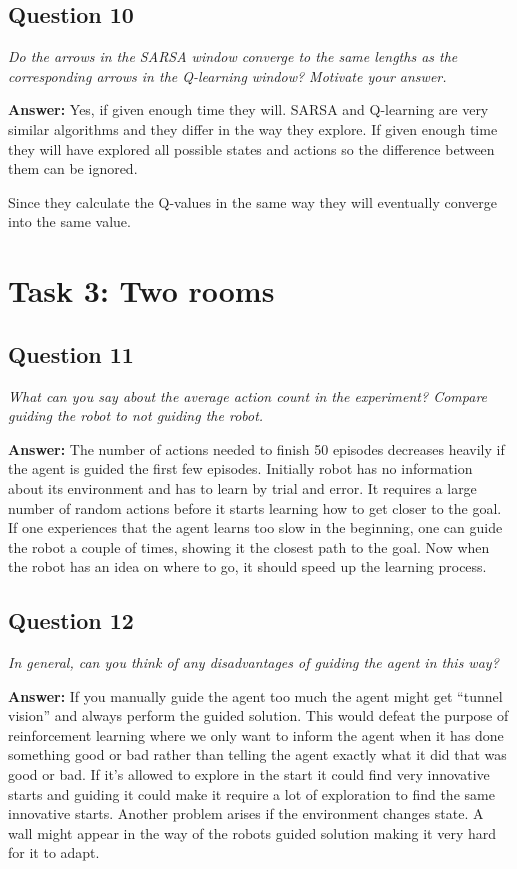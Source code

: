 \documentclass[a4paper]{article}
\begin{document}
\subsection*{Question 10}
\emph{Do the arrows in the SARSA window converge to the same
lengths as the corresponding arrows in the Q-learning window? Motivate your answer.}

\textbf{Answer:} Yes, if given enough time they will. SARSA and Q-learning are very similar algorithms and they differ in the way they explore. If given enough time they will have explored all possible states and actions so the difference between them can be ignored. 

Since they calculate the Q-values in the same way they will eventually converge into the same value.

\section{Task 3: Two rooms}

\subsection*{Question 11}
\emph{What can you say about the average action count in the experiment? Compare guiding the robot to not guiding the robot.}

\textbf{Answer:} 
The number of actions needed to finish 50 episodes decreases heavily if the agent is guided the first few episodes. Initially robot has no information about its environment and has to learn by trial and error. It requires a large number of random actions before it starts learning how to get closer to the goal. If one experiences that the agent learns too slow in the beginning, one can guide the robot a couple of times, showing it the closest path to the goal. Now when the robot has an idea on where to go, it should speed up the learning process. 

\subsection*{Question 12}
\emph{In general, can you think of any disadvantages of guiding the
agent in this way?} 

\textbf{Answer:} If you manually guide the agent too much the agent might get ``tunnel vision'' and always perform the guided solution. This would defeat the purpose of reinforcement learning where we only want to inform the agent when it has done something good or bad rather than telling the agent exactly what it did that was good or bad. If it's allowed to explore in the start it could find very innovative starts and guiding it could make it require a lot of exploration to find the same innovative starts. Another problem arises if the environment changes state. A wall might appear in the way of the robots guided solution making it very hard for it to adapt. 
\end{document}
